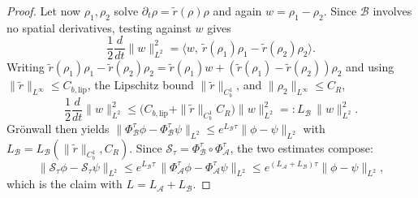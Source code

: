 \documentclass[12pt]{article}
\begin{document}
\begin{proof}
Let now $\rho_1,\rho_2$ solve $\partial_t\rho=\tilde r(\rho)\rho$ and again
$w=\rho_1-\rho_2$. Since $\mathcal B$ involves no spatial derivatives, testing
against $w$ gives
\[
\frac12\frac{d}{dt}\|w\|_{L^{2}}^{2}
=\big\langle w,\ \tilde r(\rho_1)\rho_1-\tilde r(\rho_2)\rho_2\big\rangle .
\]
Writing $\tilde r(\rho_1)\rho_1-\tilde r(\rho_2)\rho_2
=\tilde r(\rho_1)w+(\tilde r(\rho_1)-\tilde r(\rho_2))\rho_2$ and using
$\|\tilde r\|_{L^\infty}\le C_{b,\mathrm{lip}}$, the Lipschitz bound
$\|\tilde r\|_{C^{1}_b}$, and $\|\rho_2\|_{L^\infty}\le C_R$,
\[
\frac12\frac{d}{dt}\|w\|_{L^{2}}^{2}
\le \big(C_{b,\mathrm{lip}}+\|\tilde r\|_{C^{1}_b}C_R\big)\|w\|_{L^{2}}^{2}
=: L_{\mathcal B}\,\|w\|_{L^{2}}^{2}.
\]
Gr\"onwall then yields
$\big\|\Phi^{\tau}_{\mathcal B}\phi-\Phi^{\tau}_{\mathcal B}\psi\big\|_{L^{2}}
\le e^{L_{\mathcal B}\tau}\|\phi-\psi\|_{L^{2}}$ with
$L_{\mathcal B}=L_{\mathcal B}(\|\tilde r\|_{C^{1}_b},C_R)$.
Since $\mathcal S_{\tau}=\Phi^{\tau}_{\mathcal B}\circ\Phi^{\tau}_{\mathcal A}$, the two
estimates compose:
\[
\|\mathcal S_{\tau}\phi-\mathcal S_{\tau}\psi\|_{L^{2}}
\le e^{L_{\mathcal B}\tau}\,
\big\|\Phi^{\tau}_{\mathcal A}\phi-\Phi^{\tau}_{\mathcal A}\psi\big\|_{L^{2}}
\le e^{(L_{\mathcal A}+L_{\mathcal B})\tau}\|\phi-\psi\|_{L^{2}},
\]
which is the claim with $L=L_{\mathcal A}+L_{\mathcal B}$.
\end{proof}
\end{document}
